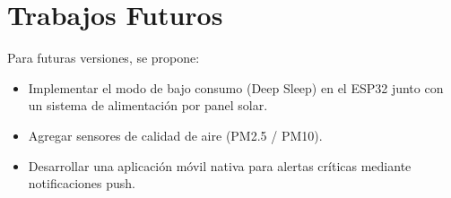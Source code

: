 \section{Trabajos Futuros}
Para futuras versiones, se propone:
\begin{itemize}
    \item Implementar el modo de bajo consumo (Deep Sleep) en el ESP32 junto con un sistema de alimentación por panel solar.
    \item Agregar sensores de calidad de aire (PM2.5 / PM10).
    \item Desarrollar una aplicación móvil nativa para alertas críticas mediante notificaciones push.
\end{itemize}
